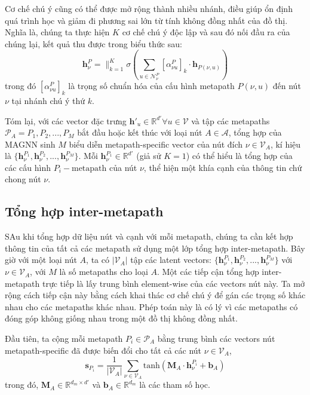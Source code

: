 Cơ chế chú ý cũng có thể được mở rộng thành nhiều nhánh, điều giúp ổn định quá trình học và giảm đi phương sai lớn từ tính không đồng nhất của đồ thị. Nghĩa là, chúng ta thực hiện $K$ cơ chế chú ý độc lập và sau đó nối đầu ra của chúng lại, kết quả thu được trong biểu thức sau:
\begin{equation}
  \mathbf{h}^P_{\nu} = \parallel ^K_{k=1} \sigma \left( \sum_{u \in \pmb{\mathcal{N}}^P_{\nu}} \left[ \alpha ^P_{\nu u} \right]_k \cdot \mathbf{h}_{P(\nu, u)} \right)
\end{equation} 
trong đó $\left[ \alpha ^P_{\nu u} \right]_k$ là trọng số chuẩn hóa của cấu hình metapath $P(\nu, u)$ đến nút $\nu$ tại nhánh chú ý thứ $k$.

Tóm lại, với các vector đặc trưng $\mathbf{h'}_{u} \in \mathbb{R}^{d'} \forall u \in \pmb{\mathcal{V}}$ và tập các metapaths $\pmb{\mathcal{P}}_A = {P_1, P_2, ..., P_M}$ bắt đầu hoặc kết thúc với loại nút $A \in \pmb{\mathcal{A}}$, tổng hợp của MAGNN sinh $M$ biểu diễn metapath-specific vector của nút đích $\nu \in \pmb{\mathcal{V}}_A$, kí hiệu là $\{ \mathbf{h}^{P_1}_{\nu}, \mathbf{h}^{P_2}_{\nu}, ... , \mathbf{h}^{P_M}_{\nu} \}$. Mỗi $\mathbf{h}^{P_1}_{\nu} \in \mathbb{R}^{d'}$ (giả sử $K=1$) có thể hiểu là tổng hợp của các cấu hình $P_i-\text{metapath}$ của nút $\nu$, thể hiện một khía cạnh của thông tin chứ chong nút $\nu$.

\subsection{Tổng hợp inter-metapath}
SAu khi tổng hợp dữ liệu nút và cạnh với mỗi metapath, chúng ta cần kết hợp thông tin của tất cả các metapath sử dụng một lớp tổng hợp inter-metapath. Bây giờ với một loại nút $A$, ta có $|\pmb{\mathcal{V}}_A|$ tập các latent vectors: $\{ \mathbf{h}^{P_1}_{\nu}, \mathbf{h}^{P_2}_{\nu}, ... , \mathbf{h}^{P_M}_{\nu} \}$ với $\nu \in \pmb{\mathcal{V}}_A$, với $M$ là số metapaths cho loại $A$. Một các tiếp cận tổng hợp inter-metapath trực tiếp là lấy trung bình element-wise của các vectors nút này. Ta mở rộng cách tiếp cận này bằng cách khai thác cơ chế chú ý để gán các trọng số khác nhau cho các metapaths khác nhau. Phép toán này là có lý vì các metapaths có đóng góp không giống nhau trong một đồ thị không đồng nhất.

Đầu tiên, ta cộng mỗi metapath $P_i \in \pmb{\mathcal{P}}_A$ bằng trung bình các vectors nút metapath-specific đã được biến đổi cho tất cả các nút $\nu \in \pmb{\mathcal{V}}_A$,
\begin{equation}
  \mathbf{s}_{P_i} = \frac{1}{|\pmb{\mathcal{V}}_A|} \sum_{\nu \in \pmb{\mathcal{V}}_A} \text{tanh} \left( \mathbf{M}_A \cdot \mathbf{h}^{P_i}_{\nu} + \mathbf{b}_A \right)
\end{equation}
trong đó, $\mathbf{M}_A \in \mathbb{R}^{d_m \times d'}$ và $\mathbf{b}_A \in \mathbb{R}^{d_m}$ là các tham số học.

